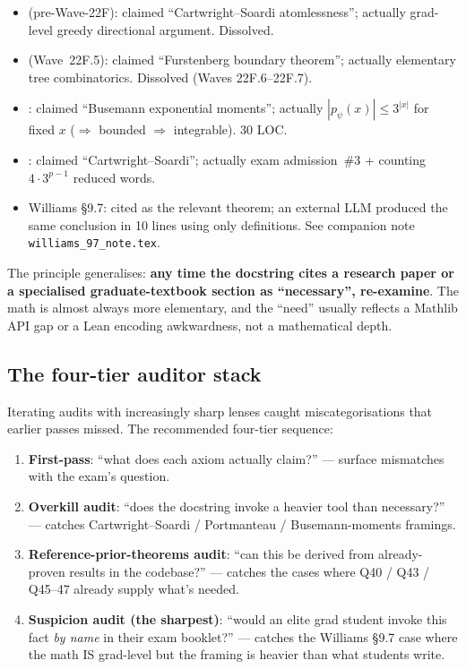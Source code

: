 \documentclass[11pt,a4paper]{article}
\theoremstyle{plain}
\theoremstyle{definition}
\begin{document}
\begin{itemize}[leftmargin=1.5em]
\item {} (pre-Wave-22F): claimed
  ``Cartwright--Soardi atomlessness''; actually grad-level greedy
  directional argument. Dissolved.
\item {} (Wave~22F.5):
  claimed ``Furstenberg boundary theorem''; actually elementary tree
  combinatorics. Dissolved (Waves 22F.6--22F.7).
\item {}: claimed ``Busemann
  exponential moments''; actually $|p_\psi(x)| \leq 3^{|x|}$ for
  fixed $x$ ($\Rightarrow$ bounded $\Rightarrow$ integrable). 30 LOC.
\item {}: claimed
  ``Cartwright--Soardi''; actually exam admission~\#3 + counting
  $4 \cdot 3^{p-1}$ reduced words.
\item Williams \S 9.7: cited as the relevant theorem; an external
  LLM produced the same conclusion in 10 lines using only definitions.
  See companion note \texttt{williams\_97\_note.tex}.
\end{itemize}

The principle generalises: \textbf{any time the docstring cites a
research paper or a specialised graduate-textbook section as
``necessary'', re-examine}. The math is almost always more elementary,
and the ``need'' usually reflects a Mathlib API gap or a Lean
encoding awkwardness, not a mathematical depth.

\subsection{The four-tier auditor stack}

Iterating audits with increasingly sharp lenses caught miscategorisations
that earlier passes missed. The recommended four-tier sequence:

\begin{enumerate}[leftmargin=1.5em]
\item \textbf{First-pass}: ``what does each axiom actually claim?'' ---
      surface mismatches with the exam's question.
\item \textbf{Overkill audit}: ``does the docstring invoke a heavier
      tool than necessary?'' --- catches Cartwright--Soardi /
      Portmanteau / Busemann-moments framings.
\item \textbf{Reference-prior-theorems audit}: ``can this be derived
      from already-proven results in the codebase?'' --- catches the
      cases where Q40 / Q43 / Q45--47 already supply what's needed.
\item \textbf{Suspicion audit (the sharpest)}: ``would an elite grad
      student invoke this fact \emph{by name} in their exam booklet?''
      --- catches the Williams \S 9.7 case where the math IS
      grad-level but the framing is heavier than what students write.
\end{enumerate}
\end{document}
